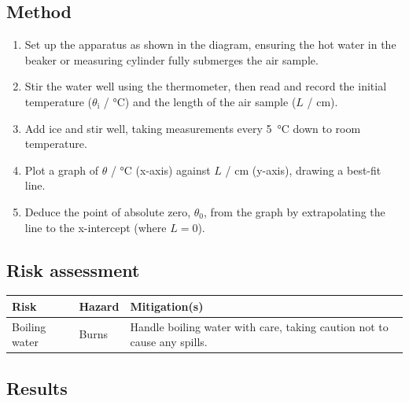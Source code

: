 \subsection{Method}
\begin{enumerate}
  \item Set up the apparatus as shown in the diagram, ensuring the hot water in the beaker or measuring cylinder fully submerges the air sample.
  \item Stir the water well using the thermometer, then read and record the initial temperature ($\theta_{\text{i}}$ / \unit{\celsius}) and the length of the air sample ($L$ / \unit{\centi\metre}).
  \item Add ice and stir well, taking measurements every \qty{5}{\celsius} down to room temperature.
  \item Plot a graph of $\theta$ / \unit{\celsius} (x-axis) against $L$ / \unit{\centi\metre} (y-axis), drawing a best-fit line.
  \item Deduce the point of absolute zero, $\theta_0$, from the graph by extrapolating the line to the x-intercept (where $L = 0$).
\end{enumerate}

\subsection{Risk assessment}
\begin{table}[H]\centering
\begin{tabularx}{\textwidth}{@{}l X X@{}}
\toprule
Risk & Hazard & Mitigation(s) \\
\midrule
Boiling water & Burns & Handle boiling water with care, taking caution not to cause any spills. \\
\bottomrule
\end{tabularx}
\end{table}

\subsection{Results}

\begin{table}[H]\centering
{}
\caption{Results table.}
\end{table}

